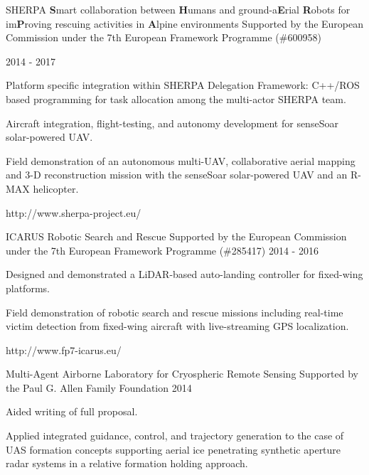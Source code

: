 \begin{cventries}
\cvprojwideentry
  	{SHERPA} %
  	{\textbf{S}mart collaboration between \textbf{H}umans and ground-a\textbf{E}rial \textbf{R}obots for im\textbf{P}roving rescuing activities in \textbf{A}lpine environments} %
    {Supported by the European Commission under the 7th European Framework Programme (\#600958)} %
    {\parbox{\linewidth}{\raggedright 2014 - 2017\linebreak}} %
    {
      \begin{cvitems} %
        \item {Platform specific integration within SHERPA Delegation Framework: C++/ROS based programming for task allocation among the multi-actor SHERPA team.}
        \item {Aircraft integration, flight-testing, and autonomy development for senseSoar solar-powered UAV.}
        \item {Field demonstration of an autonomous multi-UAV, collaborative aerial mapping and 3-D reconstruction mission with the senseSoar solar-powered UAV and an R-MAX helicopter.}
      \end{cvitems}
    } %
    {http://www.sherpa-project.eu/} %
    {\showprojectdescriptions}

\cvprojwideentry
  	{ICARUS} %
  	{Robotic Search and Rescue} %
    {Supported by the European Commission under the 7th European Framework Programme (\#285417)} %
    {2014 - 2016} %
    {
      \begin{cvitems} %
        \item {Designed and demonstrated a LiDAR-based auto-landing controller for fixed-wing platforms.}
        \item {Field demonstration of robotic search and rescue missions including real-time victim detection from fixed-wing aircraft with live-streaming GPS localization.}
      \end{cvitems}
    } %
    {http://www.fp7-icarus.eu/} %
    {\showprojectdescriptions}

\cvprojwideentry
  	{Multi-Agent Airborne Laboratory for Cryospheric Remote Sensing} %
  	{} %
    {Supported by the Paul G. Allen Family Foundation} %
    {2014} %
    {
      \begin{cvitems} %
        \item {Aided writing of full proposal.}
        \item {Applied integrated guidance, control, and trajectory generation to the case of UAS formation concepts supporting aerial ice penetrating synthetic aperture radar systems in a relative formation holding approach.}
      \end{cvitems}
    } %
    {} %
    {\showprojectdescriptions}
    

\end{cventries}
